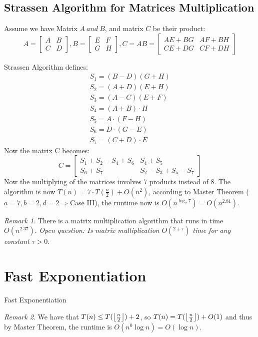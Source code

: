 \documentclass[11pt, a4paper, oneside]{book}
\DeclarePairedDelimiter\floor{\lfloor}{\rfloor}
\theoremstyle{theoremdd}
\theoremstyle{remark}
\newtheorem*{remark}{Remark}
\begin{document}
\subsection{Strassen Algorithm for Matrices Multiplication}
Assume we have Matrix $A \ and \ B$, and matrix $C$ be their product:
\[
A = 
\begin{bmatrix}
A & B \\
C & D
\end{bmatrix}
, 
B = 
\begin{bmatrix}
E & F \\
G & H
\end{bmatrix}
,
C = AB = 
\begin{bmatrix}
AE+BG & AF+BH \\
CE+DG & CF+DH
\end{bmatrix}
\]

Strassen Algorithm defines: 
\begin{align*}
& S_{1} = (B-D)(G+H) &\\
& S_{2} = (A+D)(E+H) &\\
& S_{3} = (A-C)(E+F) &\\
& S_{4} = (A+B)\cdot H & \\
& S_{5} = A\cdot (F-H) &\\
& S_{6} = D\cdot (G-E) &\\
& S_{7} = (C+D)\cdot E 
\end{align*}
Now the matrix C becomes: 
\[
	C = 
	\begin{bmatrix}
	S_{1}+S_{2}-S_{4}+S_{6} & S_{4}+S_{5} \\
	S_{6}+S_{7}             & S_{2}-S_{3}+S_{5}-S_{7}
	\end{bmatrix}
\]
Now the multiplying of the matrices involves 7 products instead of 8. The algorithm is now $T(n) = 7\cdot T(\frac{n}{2}) + O(n^2)$, according to Master Theorem ($a=7, b=2, d=2 \Rightarrow $Case III), the runtime now is $O(n^{\log_{2} 7}) = O(n^{2.81})$. 

\begin{remark}
There is a matrix multiplication algorithm that runs in time $O(n^{2.37})$. \textit{Open question: Is matrix multiplication } $O(^{2+\tau})$ \textit{time for any constant } $\tau > 0$.
\end{remark}

\section{Fast Exponentiation}

\begin{algorithm}[H]
\SetAlgoLined
{}
\caption{Fast Exponentiation}
\end{algorithm}
\begin{remark}
We have that $T(n) \leq T(\floor*{\frac{n}{2}}) + 2$, so $T(n) = T(\floor*{\frac{n}{2}})+O(1)$ and thus by Master Theorem, the runtime is $O(n^{0}\log n) = O(\log n)$.
\end{remark}
\end{document}
